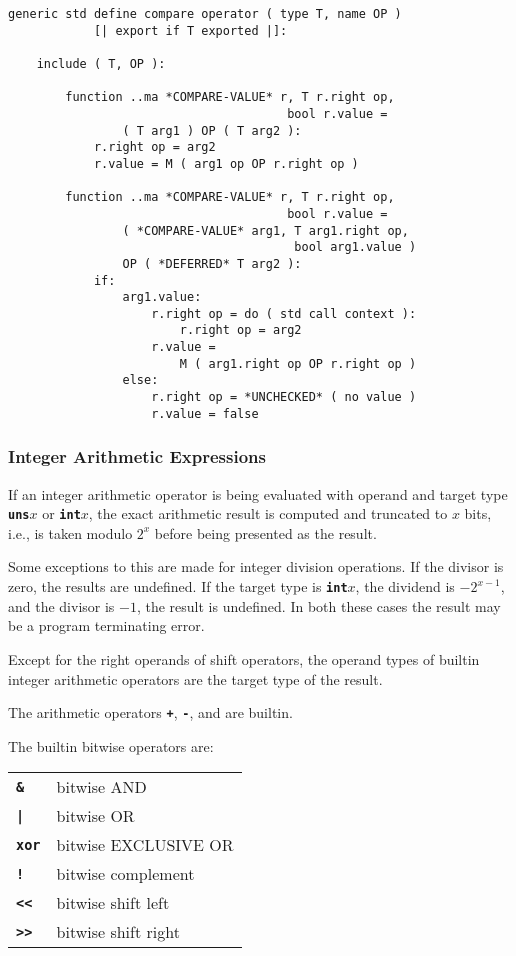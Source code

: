 \documentclass[12pt]{article}
\newcommand{\TT}[1]{{\tt \bfseries #1}}
\newenvironment{indpar}[1][0.3in]%
	{\begin{list}{}%
		     {\setlength{\itemsep}{0in}%
		      \setlength{\topsep}{0in}%
		      \setlength{\parsep}{1ex}%
		      \setlength{\labelwidth}{#1}%
		      \setlength{\leftmargin}{#1}%
		      \addtolength{\leftmargin}{\labelsep}}%
	 \item}%
	{\end{list}}
\begin{document}
\label{DEFINE-COMPARE-OPERATOR}%
\begin{indpar}\begin{verbatim}
generic std define compare operator ( type T, name OP )
            [| export if T exported |]:

    include ( T, OP ):

        function ..ma *COMPARE-VALUE* r, T r.right op,
                                       bool r.value =
                ( T arg1 ) OP ( T arg2 ):
            r.right op = arg2
            r.value = M ( arg1 op OP r.right op )

        function ..ma *COMPARE-VALUE* r, T r.right op,
                                       bool r.value =
                ( *COMPARE-VALUE* arg1, T arg1.right op,
                                        bool arg1.value )
                OP ( *DEFERRED* T arg2 ):
            if:
                arg1.value:
                    r.right op = do ( std call context ):
                        r.right op = arg2
                    r.value =
                        M ( arg1.right op OP r.right op )
                else:
                    r.right op = *UNCHECKED* ( no value )
                    r.value = false
\end{verbatim}\end{indpar}

\subsubsection{Integer Arithmetic Expressions}

If an integer arithmetic operator is being evaluated with
operand and target type \TT{uns$x$} or \TT{int$x$}, the
exact arithmetic result is computed and truncated to
$x$ bits, i.e., is taken modulo $2^x$ before being presented
as the result.

Some exceptions to this are made for integer division operations.
If the divisor is zero, the results are undefined.  If the
target type is \TT{int$x$}, the dividend is $-2^{x-1}$, and
the divisor is $-1$, the result is undefined.  In both these
cases the result may be a program terminating error.

Except for the right operands of
shift operators, the operand types of builtin
integer arithmetic operators are the target type of the result.

The arithmetic operators \TT{+}, \TT{-}, and \TT{*} are builtin.

The builtin bitwise operators are:
\begin{center}
\begin{tabular}{ll}
\TT{\&}		& bitwise AND \\
\TT{|}		& bitwise OR \\
\TT{xor}	& bitwise EXCLUSIVE OR \\
\TT{!}		& bitwise complement \\
\TT{<{}<}	& bitwise shift left \\
\TT{>{}>}	& bitwise shift right \\
\end{tabular}
\end{center}
\end{document}
